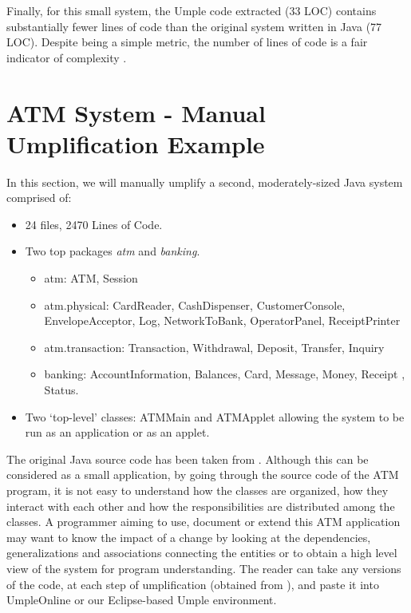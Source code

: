 Finally, for this small system, the Umple code extracted (33 LOC) contains substantially fewer lines of code than the original system written in Java (77 LOC). Despite being a simple metric, the number of lines of code is a fair indicator of complexity \cite{LOCMetric}. 

\section{ATM System - Manual Umplification Example}

In this section, we will manually umplify a second, moderately-sized Java system comprised of:

\begin{itemize}
 \item 24 files, 2470 Lines of Code.
 \item Two top packages \textit{atm} and \textit{banking}.
	\begin{itemize}
	 \item atm: ATM, Session
	 \item atm.physical: CardReader, CashDispenser, CustomerConsole, EnvelopeAcceptor, Log, NetworkToBank, OperatorPanel, ReceiptPrinter
	 \item atm.transaction: Transaction, Withdrawal, Deposit, Transfer, Inquiry
	 \item banking: AccountInformation, Balances, Card, Message, Money, Receipt , Status.
	\end{itemize}
 \item Two `top-level' classes: ATMMain and ATMApplet allowing the system to be run as an application or as an applet.
\end{itemize}

The original Java source code has been taken from \cite{atmsystem}. Although this can be considered as a small application, by going through the source code of the ATM program, it is not easy to understand how the classes are organized, how they interact with each other and how the responsibilities are distributed among the classes. A programmer aiming to use, document or extend this ATM application may want to know the impact of a change by looking at the dependencies, generalizations and associations connecting the entities or to obtain a high level view of the system for program understanding. The reader can take any versions of the code, at each step of umplification (obtained from \cite{UmplificationBasicExampleURL}), and paste it into UmpleOnline \cite{UmpleOnline} or our Eclipse-based Umple environment. 

